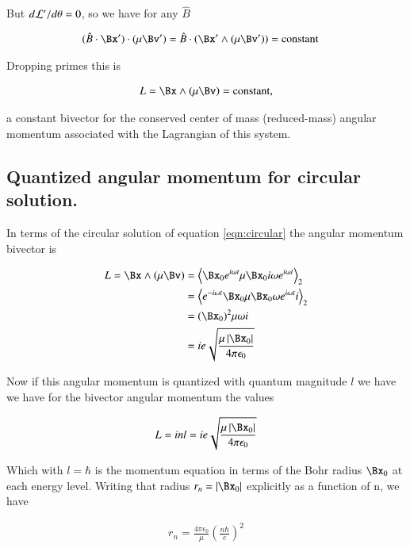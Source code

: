 \documentclass{article}
\begin{document}
But $d\mathcal{L}'/d\theta = 0$, so we have for any $\hat{B}$

\begin{align*}
(\hat{B} \cdot \Bx') \cdot (\mu \Bv') &= \hat{B} \cdot (\Bx' \wedge (\mu \Bv')) = \text{constant}
\end{align*}

Dropping primes this is

\begin{align*}
L = \Bx \wedge (\mu \Bv) = \text{constant},
\end{align*}

a constant bivector for the conserved center of mass (reduced-mass) angular momentum associated with the Lagrangian of this system.

\subsection{ Quantized angular momentum for circular solution. }

In terms of the circular solution of equation \ref{eqn:circular} the angular momentum bivector is

\begin{align*}
L = \Bx \wedge (\mu \Bv) 
&= \gpgradetwo{ \Bx_0 e^{i \omega t} \mu \Bx_0 i \omega e^{i \omega t} } \\
&= \gpgradetwo{ e^{-i \omega t} \Bx_0 \mu \Bx_0 \omega e^{i \omega t} i } \\
&= (\Bx_0)^2 \mu \omega i \\
&= i e \sqrt{\frac{\mu \Abs{\Bx_0}}{4 \pi \epsilon_0}}
\end{align*}

Now if this angular momentum is quantized with quantum magnitude $l$ we have we have for the bivector angular momentum the values

\begin{align}
L = i n l = i e \sqrt{\frac{\mu \Abs{\Bx_0}}{4 \pi \epsilon_0}}
\end{align}

Which with $l = \hbar$ is the momentum equation in terms of the Bohr radius $\Bx_0$ at each energy level.  Writing that radius $r_n = \Abs{\Bx_0}$ explicitly as a function of n, we have

\begin{align*}
r_n = \frac{4 \pi \epsilon_0}{\mu} \left(\frac{n \hbar}{e}\right)^2 
\end{align*}








\end{document}
